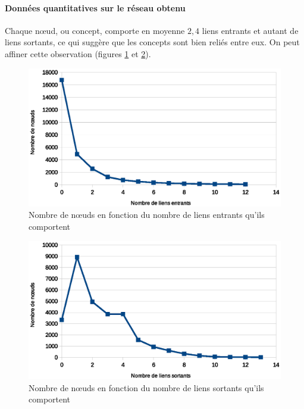 \documentclass[a4paper, 12pt]{article}
\begin{document}
\paragraph{Données quantitatives sur le réseau obtenu}

Chaque n\oe{}ud, ou concept, comporte en moyenne $2,4$ liens entrants et autant de liens sortants, ce qui suggère que les concepts sont bien reliés entre eux. On peut affiner cette observation (figures \ref{fig:liens_entrants} et \ref{fig:liens_sortants}).

\begin{figure}[h]
 \centering
 \includegraphics[width=12cm]{./liens_entrants.eps}
 \caption{Nombre de n\oe{}uds en fonction du nombre de liens entrants qu'ils comportent}
 \label{fig:liens_entrants}
\end{figure}


\begin{figure}[h]
 \centering
 \includegraphics[width=12cm]{./liens_sortants.eps}
 \caption{Nombre de n\oe{}uds en fonction du nombre de liens sortants qu'ils comportent}
 \label{fig:liens_sortants}
\end{figure}
\end{document}
